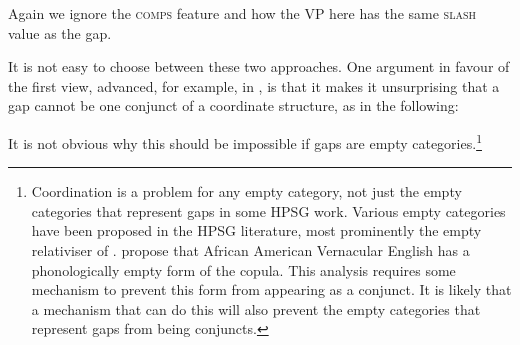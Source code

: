 \documentclass[output=paper
,notxmath 
	        ,collection
	        ,collectionchapter
 	        ,biblatex
                ,babelshorthands
                ,newtxmath
                ,draftmode
                ,colorlinks, citecolor=brown
]{langscibook}
\begin{document}

\noindent
Again we ignore the \textsc{comps} feature and how the VP here has the same \textsc{slash}
value as the gap.

It is not easy to choose between these two approaches. One argument in
favour of the first view, advanced, for example, in \citet[Section~3.5.2]{Bouma:Malouf:Sag:01}, is that it makes it unsurprising that a gap cannot be one
conjunct of a coordinate structure, as in the following:

\begin{exe} \ex \begin{xlist} \label{ex:UDC:22}

\end{xlist}
\end{exe}

\noindent
It is not obvious why this should be impossible if gaps are empty
categories.\footnote{Coordination is a problem for any empty category,
  not just the empty categories that represent gaps in some HPSG
  work. Various empty categories have been proposed in the HPSG
  literature, most prominently the empty relativiser of
  \citet[Chapter~5]{Pollard:Sag:94}. \citet[Section~15.3.5]{Sag:Wasow:ea:03}
  propose that African American Vernacular English has a
  phonologically empty form of the copula. This analysis requires some
  mechanism to prevent this form from appearing as a conjunct. It is
  likely that a mechanism that can do this will also prevent the empty
  categories that represent gaps from being conjuncts.
 }
\end{document}
